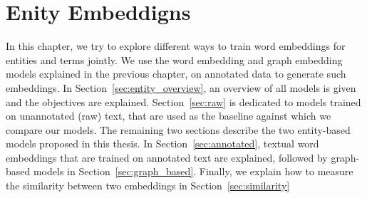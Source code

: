 \chapter{Enity Embeddigns}\label{chap:entity}
In this chapter, we try to explore different ways to train word embeddings for entities and terms jointly. We use the word embedding and graph embedding models explained in the previous chapter, on annotated data to generate such embeddings. In Section~\ref{sec:entity_overview}, an overview of all models is given and the objectives are explained. Section~\ref{sec:raw} is dedicated to models trained on unannotated (raw) text, that are used as the baseline against which we compare our models. The remaining two sections describe the two entity-based models proposed in this thesis. In Section~\ref{sec:annotated},  textual word embeddings that are trained on annotated text are explained, followed by graph-based models in Section~\ref{sec:graph_based}. Finally, we explain how to measure the similarity between two embeddings in Section~\ref{sec:similarity}

